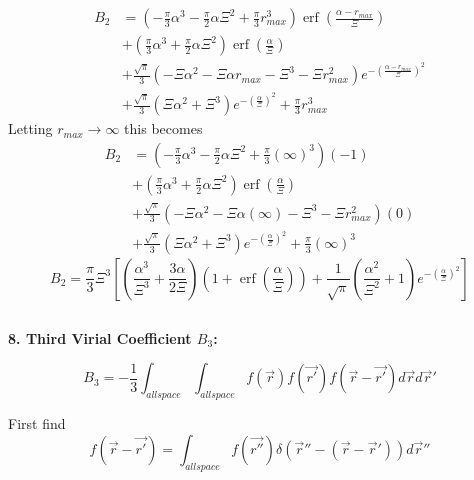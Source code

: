 \documentclass[12pt]{article}
\begin{document}
\begin{align}
  B_2 &= \left(-\frac{\pi}{3}\alpha^3-\frac{\pi}{2}\alpha\Xi^2+\frac{\pi}{3}r_{max}^3\right)\operatorname{erf}\left(\frac{\alpha-r_{max}}{\Xi}\right) \\
      &+ \left(\frac{\pi}{3}\alpha^3+\frac{\pi}{2}\alpha\Xi^2\right)\operatorname{erf}\left(\frac{\alpha}{\Xi}\right) \\
      &+ \frac{\sqrt{\pi}}{3}\left(-\Xi\alpha^2-\Xi\alpha r_{max}-\Xi^3-\Xi r_{max}^2\right)e^{-{\left(\frac{\alpha-r_{max}}{\Xi}\right)^2}} \\
      &+ \frac{\sqrt{\pi}}{3}\left(\Xi\alpha^2+\Xi^3\right)e^{-\left(\frac{\alpha}{\Xi}\right)^2}+\frac{\pi}{3}r_{max}^3 
\end{align}
Letting $r_{max}\rightarrow\infty$ this becomes
\begin{align}
  B_2 &= \left(-\frac{\pi}{3}\alpha^3-\frac{\pi}{2}\alpha\Xi^2+\frac{\pi}{3}\left(\infty\right)^3\right)\left(-1\right) \\
      &+ \left(\frac{\pi}{3}\alpha^3+\frac{\pi}{2}\alpha\Xi^2\right)\operatorname{erf}\left(\frac{\alpha}{\Xi}\right) \\
      &+ \frac{\sqrt{\pi}}{3}\left(-\Xi\alpha^2-\Xi\alpha\left(\infty\right)-\Xi^3-\Xi r_{max}^2\right)\left(0\right) \\
      &+ \frac{\sqrt{\pi}}{3}\left(\Xi\alpha^2+\Xi^3\right)e^{-\left(\frac{\alpha}{\Xi}\right)^2}+\frac{\pi}{3}\left(\infty\right)^3 
\end{align}
\begin{equation}B_2 = \frac{\pi}{3}\Xi^3\left[\left(\frac{\alpha^3}{\Xi^3}+\frac{3\alpha}{2\Xi}\right)\left(1+\operatorname{erf}\left(\frac{\alpha}{\Xi}\right)\right)+\frac{1}{\sqrt{\pi}}\left(\frac{\alpha^2}{\Xi^2}+1\right)e^{-\left(\frac{\alpha}{\Xi}\right)^2}\right]\end{equation}

\[{}\]

\textbf{8. Third Virial Coefficient $B_{3}$:}

\begin{equation}\label{B3}B_3=-\frac{1}{3}\int_{allspace}\int_{allspace}f(\vec{r})f(\vec{r'})f(\vec{r}-\vec{r'})d\vec rd\vec r'\end{equation}

First find
\begin{equation}f(\vec{r}-\vec{r'})=\int_{allspace}f(\vec{r''})\delta(\vec{r}''-(\vec{r}-\vec{r}'))d\vec r'' \end{equation}
\end{document}
